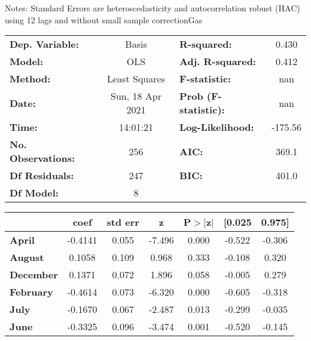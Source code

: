 Notes: \newline
 [1] Standard Errors are heteroscedasticity and autocorrelation robust (HAC) using 12 lags and without small sample correctionGas\begin{center}
\begin{tabular}{lclc}
\toprule
\textbf{Dep. Variable:}    &      Basis       & \textbf{  R-squared:         } &     0.430   \\
\textbf{Model:}            &       OLS        & \textbf{  Adj. R-squared:    } &     0.412   \\
\textbf{Method:}           &  Least Squares   & \textbf{  F-statistic:       } &       nan   \\
\textbf{Date:}             & Sun, 18 Apr 2021 & \textbf{  Prob (F-statistic):} &      nan    \\
\textbf{Time:}             &     14:01:21     & \textbf{  Log-Likelihood:    } &   -175.56   \\
\textbf{No. Observations:} &         256      & \textbf{  AIC:               } &     369.1   \\
\textbf{Df Residuals:}     &         247      & \textbf{  BIC:               } &     401.0   \\
\textbf{Df Model:}         &           8      & \textbf{                     } &             \\
\bottomrule
\end{tabular}
\begin{tabular}{lcccccc}
                  & \textbf{coef} & \textbf{std err} & \textbf{z} & \textbf{P$> |$z$|$} & \textbf{[0.025} & \textbf{0.975]}  \\
\midrule
\textbf{April}    &      -0.4141  &        0.055     &    -7.496  &         0.000        &       -0.522    &       -0.306     \\
\textbf{August}   &       0.1058  &        0.109     &     0.968  &         0.333        &       -0.108    &        0.320     \\
\textbf{December} &       0.1371  &        0.072     &     1.896  &         0.058        &       -0.005    &        0.279     \\
\textbf{February} &      -0.4614  &        0.073     &    -6.320  &         0.000        &       -0.605    &       -0.318     \\
\textbf{July}     &      -0.1670  &        0.067     &    -2.487  &         0.013        &       -0.299    &       -0.035     \\
\textbf{June}     &      -0.3325  &        0.096     &    -3.474  &         0.001        &       -0.520    &       -0.145     \\

\end{tabular}
\end{center}
